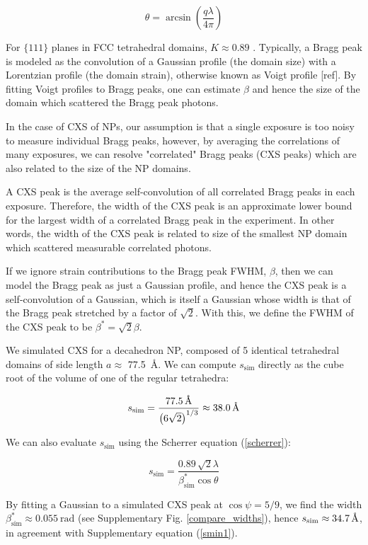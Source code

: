 \documentclass [12pt,fleqn]{article}
\newcommand{\angstrom}{\textup{\AA}}
\def \be {\begin{equation}}
\def \ee {\end{equation}}
\begin{document}
\be
\theta = \arcsin \left ( \frac{q \lambda}{4 \pi} \right  )
\ee

For $\{111\}$ planes in FCC tetrahedral domains, $K \approx 0.89$ \cite{langford1978scherrer}. Typically, a Bragg peak is modeled as the convolution of a Gaussian profile (the domain size) with a Lorentzian profile (the domain strain), otherwise known as Voigt profile [ref]. By fitting Voigt profiles to Bragg peaks, one can estimate $\beta$ and hence the size of the domain which scattered the Bragg peak photons.

In the case of CXS of NPs, our assumption is that a single exposure is too noisy to measure individual Bragg peaks, however, by averaging the correlations of many exposures, we can resolve "correlated" Bragg peaks (CXS peaks) which are also related to the size of the NP domains.

A CXS peak is the average self-convolution of all correlated Bragg peaks in each exposure. Therefore, the width of the CXS peak is an approximate lower bound for the largest width of a correlated Bragg peak in the experiment. In other words, the width of the CXS peak is related to size of the smallest NP domain which scattered measurable correlated photons.

If we ignore strain contributions to the Bragg peak FWHM, $\beta$, then we can model the Bragg peak as just a Gaussian profile, and hence the CXS peak is a self-convolution of a Gaussian, which is itself a Gaussian whose width is that of the Bragg peak stretched by a factor of $\sqrt{2}$. With this, we define the FWHM of the CXS peak to be $\beta^* = \sqrt{2} \beta$.

We simulated CXS for a decahedron NP, composed of 5 identical tetrahedral domains of side length $a\approx$ \SI{77.5}{\angstrom}. We can compute $s_{\text{sim}}$ directly as the cube root of the volume of one of the regular tetrahedra:

\be \label{smin1}
s_{\text{sim}} = \frac{ \SI{77.5}{\angstrom}} {\left( 6\sqrt{2} \right )^{1/3}} \approx \SI{38.0}{\angstrom}
\ee

We can also evaluate $s_{\text{sim}}$ using the Scherrer equation (\ref{scherrer}): 

\be
s_{\text{sim}} = \frac{0.89 \, \sqrt{2} \lambda}{ \beta^*_{\text{sim}} \cos \theta}
\ee

By fitting a Gaussian to a simulated CXS peak at $\cos \psi = {5/9}$, we find the width $\beta^*_{\text{sim}} \approx \SI{0.055}{\radian}$ (see Supplementary Fig. \ref{compare_widths}), hence $s_{\text{sim}} \approx  \SI{34.7}{\angstrom}$, in agreement with Supplementary equation (\ref{smin1}).
\end{document}
